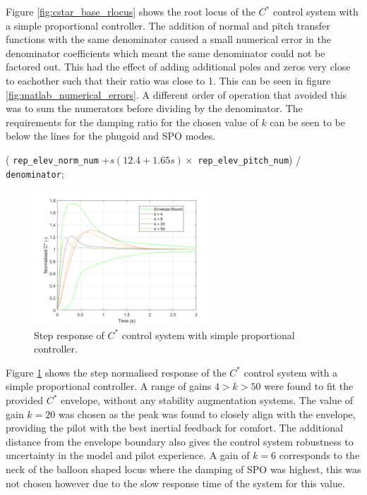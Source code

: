 \documentclass{article}
\begin{document}
Figure \ref{fig:cstar_base_rlocus} shows the root locus of the $C^*$ control system with a simple proportional controller.
The addition of normal and pitch transfer functions with the same denominator caused a small numerical error in the denominator coefficients
which meant the same denominator could not be factored out.
This had the effect of adding additional poles and zeros very close to eachother such that their ratio was close to 1.
This can be seen in figure \ref{fig:matlab_numerical_errors}.
A different order of operation that avoided this was to sum the numerators before dividing by the denominator.
The requirements for the damping ratio for the chosen value of $k$ can be seen to be below the lines for the phugoid and SPO modes.

\begin{center}
     ( \texttt{rep\_elev\_norm\_num} $ + s(12.4 + 1.65s) \times $  \texttt{rep\_elev\_pitch\_num}) / \texttt{denominator};
\end{center}

\begin{figure}[H]
    \centering
    \includegraphics[width=0.6\textwidth]{figures/cstar_envelope_step.png}
    \caption{Step response of $C^*$ control system with simple proportional controller.}
    \label{fig:cstar_base_step}
\end{figure}

Figure \ref{fig:cstar_base_step} shows the step normalised response of the $C^*$ control system with a simple proportional controller.
A range of gains $4 > k > 50$ were found to fit the provided $C^*$ envelope, without any stability augmentation systems.
The value of gain $k=20$ was chosen as the peak was found to closely align with the envelope, providing the pilot with the best inertial feedback for comfort.
The additional distance from the envelope boundary also gives the control system robustness to uncertainty in the model and pilot experience.
A gain of $k=6$ corresponds to the neck of the balloon shaped locus where the damping of SPO was highest, this was not chosen however due to the slow response time of the system for this value.
\end{document}
